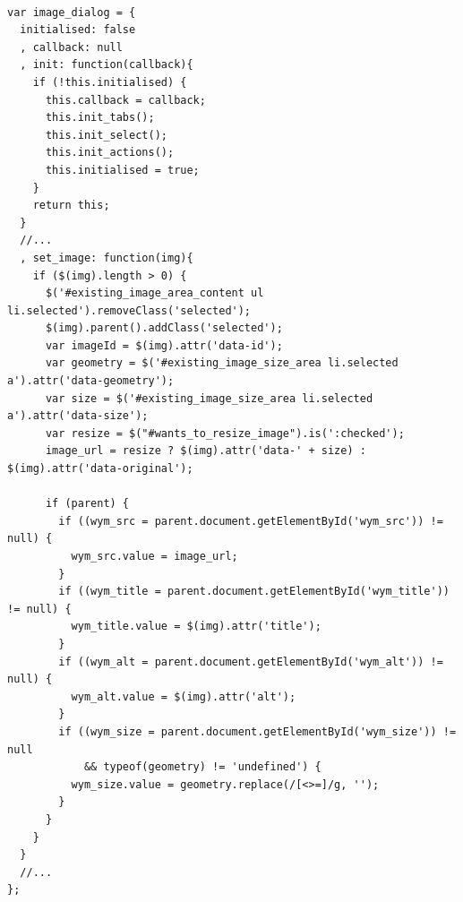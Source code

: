\begin{lstlisting}[label=refineryoutput,caption=Beispiel für eine JavaScript-Funktion zur Realisierung des Bildauswahldialogs in Refinery CMS. Das Codebeispiel zeigt ebenfalls die Abhängigkeit zu dem verwendeten HTML-Markup (z.B. Zeile 18)]

var image_dialog = {
  initialised: false
  , callback: null
  , init: function(callback){
    if (!this.initialised) {
      this.callback = callback;
      this.init_tabs();
      this.init_select();
      this.init_actions();
      this.initialised = true;
    }
    return this;
  }
  //...
  , set_image: function(img){
    if ($(img).length > 0) {
      $('#existing_image_area_content ul li.selected').removeClass('selected');
      $(img).parent().addClass('selected');
      var imageId = $(img).attr('data-id');
      var geometry = $('#existing_image_size_area li.selected a').attr('data-geometry');
      var size = $('#existing_image_size_area li.selected a').attr('data-size');
      var resize = $("#wants_to_resize_image").is(':checked');
      image_url = resize ? $(img).attr('data-' + size) : $(img).attr('data-original');

      if (parent) {
        if ((wym_src = parent.document.getElementById('wym_src')) != null) {
          wym_src.value = image_url;
        }
        if ((wym_title = parent.document.getElementById('wym_title')) != null) {
          wym_title.value = $(img).attr('title');
        }
        if ((wym_alt = parent.document.getElementById('wym_alt')) != null) {
          wym_alt.value = $(img).attr('alt');
        }
        if ((wym_size = parent.document.getElementById('wym_size')) != null
            && typeof(geometry) != 'undefined') {
          wym_size.value = geometry.replace(/[<>=]/g, '');
        }
      }
    }
  }
  //...
};
\end{lstlisting}


